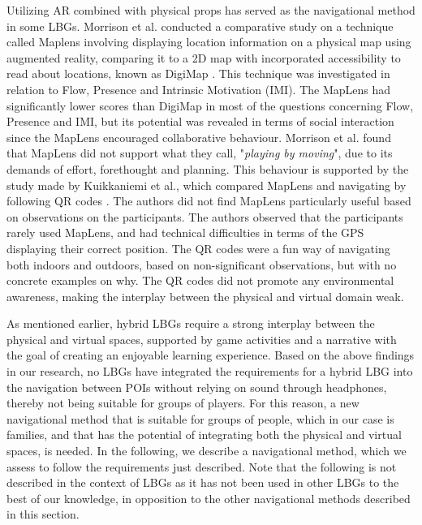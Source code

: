 Utilizing AR combined with physical props has served as the navigational method in some LBGs. Morrison et al. conducted a comparative study on a technique called Maplens involving displaying location information on a physical map using augmented reality, comparing it to a 2D map with incorporated accessibility to read about locations, known as DigiMap \cite{Morrison}. This technique was investigated in relation to Flow, Presence and Intrinsic Motivation (IMI). The MapLens had significantly lower scores than DigiMap in most of the questions concerning Flow, Presence and IMI, but its potential was revealed in terms of social interaction since the MapLens encouraged collaborative behaviour.  Morrison et al. found that MapLens did not support what they call, "\textit{playing by moving}", due to its demands of effort, forethought and planning. This behaviour is supported by the study made by Kuikkaniemi et al., which compared MapLens and navigating by following QR codes \cite{LostLab}. The authors did not find MapLens particularly useful based on observations on the participants. The authors observed that the participants rarely used MapLens, and had technical difficulties in terms of the GPS displaying their correct position. The QR codes were a fun way of navigating both indoors and outdoors, based on non-significant observations, but with no concrete examples on why. The QR codes did not promote any environmental awareness, making the interplay between the physical and virtual domain weak. 

As mentioned earlier, hybrid LBGs require a strong interplay between the physical and virtual spaces, supported by game activities and a narrative with the goal of creating an enjoyable learning experience. Based on the above findings in our research, no LBGs have integrated the requirements for a hybrid LBG into the navigation between POIs without relying on sound through headphones, thereby not being suitable for groups of players. For this reason, a new navigational method that is suitable for groups of people, which in our case is families, and that has the potential of integrating both the physical and virtual spaces, is needed. In the following, we describe a navigational method, which we assess to follow the requirements just described. Note that the following is not described in the context of LBGs as it has not been used in other LBGs to the best of our knowledge, in opposition to the other navigational methods described in this section.

